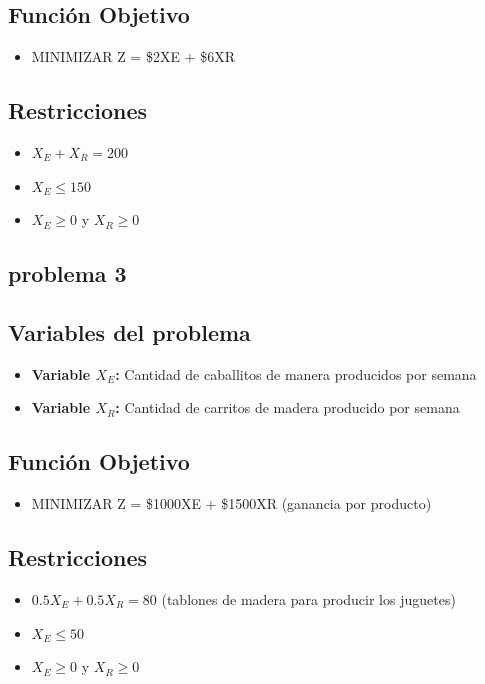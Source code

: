 \documentclass{article}
\begin{document}
\subsection*{Función Objetivo}
\begin{itemize}
    \item MINIMIZAR Z = \$2XE + \$6XR
\end{itemize}

\subsection*{Restricciones}
\begin{itemize}
    \item $X_E + X_R = 200$ 
    \item $X_E \leq 150$ 
    \item $X_E \geq 0$ y $X_R \geq 0$ 
\end{itemize}

\vspace{6cm}
\subsection*{problema 3}
\subsection*{Variables del problema}
\begin{itemize}
    \item \textbf{Variable $X_E$:} Cantidad de caballitos de manera producidos por semana
    \item \textbf{Variable $X_R$:} Cantidad de carritos de madera producido por semana
\end{itemize}

\subsection*{Función Objetivo}
\begin{itemize}
    \item MINIMIZAR Z = \$1000XE + \$1500XR (ganancia por producto)
\end{itemize}

\subsection*{Restricciones}
\begin{itemize}
    \item $0.5X_E + 0.5X_R = 80$ (tablones de madera para producir los juguetes) 
    \item $X_E \leq 50$ 
    \item $X_E \geq 0$ y $X_R \geq 0$ 
\end{itemize}
\end{document}

